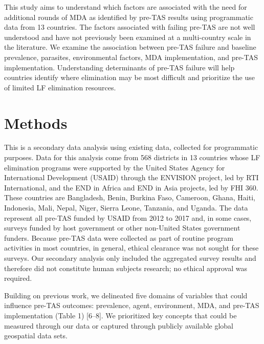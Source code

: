 \documentclass[11pt,a4paper]{article}
\begin{document}
This study aims to understand which factors are associated with the need for additional rounds of MDA as identified by pre-TAS results using programmatic data from 13 countries. The factors associated with failing pre-TAS are not well understood and have not previously been examined at a multi-country scale in the literature. We examine the association between pre-TAS failure and baseline prevalence, parasites, environmental factors, MDA implementation, and pre-TAS implementation. Understanding determinants of pre-TAS failure will help countries identify where elimination may be most difficult and prioritize the use of limited LF elimination resources.

\section{Methods}

This is a secondary data analysis using existing data, collected for programmatic purposes. Data for this analysis come from 568 districts in 13 countries whose LF elimination programs were supported by the United States Agency for International Development (USAID) through the ENVISION project, led by RTI International, and the END in Africa and END in Asia projects, led by FHI 360. These countries are Bangladesh, Benin, Burkina Faso, Cameroon, Ghana, Haiti, Indonesia, Mali, Nepal, Niger, Sierra Leone, Tanzania, and Uganda. The data represent all pre-TAS funded by USAID from 2012 to 2017 and, in some cases, surveys funded by host government or other non-United States government funders. Because pre-TAS data were collected as part of routine program activities in most countries, in general, ethical clearance was not sought for these surveys. Our secondary analysis only included the aggregated survey results and therefore did not constitute human subjects research; no ethical approval was required.

Building on previous work, we delineated five domains of variables that could influence pre-TAS outcomes: prevalence, agent, environment, MDA, and pre-TAS implementation (Table 1) [6–8]. We prioritized key concepts that could be measured through our data or captured through publicly available global geospatial data sets.
\end{document}
